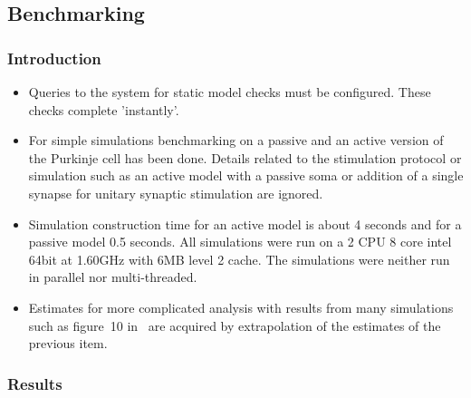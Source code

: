 \documentclass[12pt]{article}
\begin{document}
\subsection*{Benchmarking}

\subsubsection*{Introduction}

\begin{itemize}
\item Queries to the system for static model checks must be
  configured.  These checks complete 'instantly'.
\item For simple simulations benchmarking on a passive and an active
  version of the Purkinje cell has been done.  Details related to the
  stimulation protocol or simulation such as an active model with a
  passive soma or addition of a single synapse for unitary synaptic
  stimulation are ignored.
\item Simulation construction time for an active model is about 4
  seconds and for a passive model 0.5 seconds.  All simulations were
  run on a 2 CPU 8 core intel 64bit at 1.60GHz with 6MB level 2 cache.
  The simulations were neither run in parallel nor multi-threaded.
\item Estimates for more complicated analysis with results from many
  simulations such as figure~10 in~\cite{E:1994hc} are acquired by
  extrapolation of the estimates of the previous item.
\end{itemize}


\subsubsection*{Results}
\end{document}
